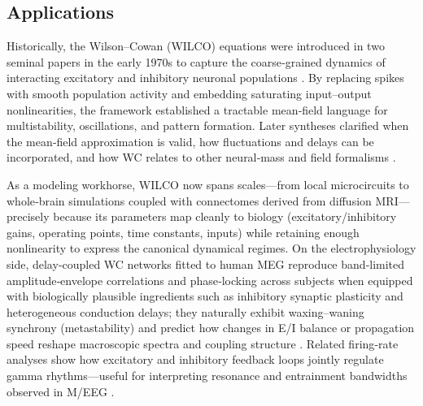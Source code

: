 \documentclass[12pt]{article}
\numberwithin{equation}{section}
\begin{document}
\subsection{Applications}

Historically, the Wilson--Cowan (WILCO) equations were introduced in two seminal papers in the early 1970s to capture the coarse‑grained dynamics of interacting excitatory and inhibitory neuronal populations \cite{WilsonCowan1972,WilsonCowan1973}. By replacing spikes with smooth population activity and embedding saturating input–output nonlinearities, the framework established a tractable mean‑field language for multistability, oscillations, and pattern formation. Later syntheses clarified when the mean‑field approximation is valid, how fluctuations and delays can be incorporated, and how WC relates to other neural‑mass and field formalisms \cite{DestexheSejnowski2009,Cowan2016,ChowKarimipanah2020}.

As a modeling workhorse, WILCO now spans scales—from local microcircuits to whole‑brain simulations coupled with connectomes derived from diffusion MRI—precisely because its parameters map cleanly to biology (excitatory/inhibitory gains, operating points, time constants, inputs) while retaining enough nonlinearity to express the canonical dynamical regimes. On the electrophysiology side, delay‑coupled WC networks fitted to human MEG reproduce band‑limited amplitude‑envelope correlations and phase‑locking across subjects when equipped with biologically plausible ingredients such as inhibitory synaptic plasticity and heterogeneous conduction delays; they naturally exhibit waxing–waning synchrony (metastability) and predict how changes in E/I balance or propagation speed reshape macroscopic spectra and coupling structure \cite{Abeysuriya2018}. Related firing‑rate analyses show how excitatory and inhibitory feedback loops jointly regulate gamma rhythms—useful for interpreting resonance and entrainment bandwidths observed in M/EEG \cite{Keeley2019}.
\end{document}
